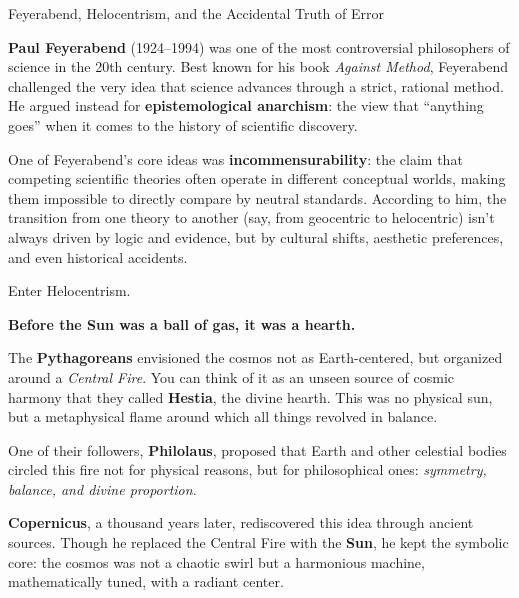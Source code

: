 \begin{HistoricalSidebar}{Feyerabend, Helocentrism, and the Accidental Truth of Error}

  \textbf{Paul Feyerabend} (1924–1994) was one of the most controversial philosophers of science in the 20th century. 
  Best known for his book \textit{Against Method}, Feyerabend challenged the very idea that science advances through 
  a strict, rational method. He argued instead for \textbf{epistemological anarchism}: the view that “anything goes” 
  when it comes to the history of scientific discovery.
  
  \medskip
  
  One of Feyerabend’s core ideas was \textbf{incommensurability}: the claim that competing scientific theories often 
  operate in different conceptual worlds, making them impossible to directly compare by neutral standards. According 
  to him, the transition from one theory to another (say, from geocentric to helocentric) isn’t always driven by logic 
  and evidence, but by cultural shifts, aesthetic preferences, and even historical accidents.
  
  \medskip

  Enter Helocentrism.

  \medskip

  \textbf{Before the Sun was a ball of gas, it was a hearth.}

  \medskip
  
  The \textbf{Pythagoreans} envisioned the cosmos not as Earth-centered, but organized around a \textit{Central Fire}.
  You can think of it as an unseen source of cosmic harmony that they called \textbf{Hestia}, the divine hearth. This 
  was no physical sun, but a metaphysical flame around which all things revolved in balance.

  \medskip
  
  One of their followers, \textbf{Philolaus}, proposed that Earth and other celestial bodies circled this fire
  not for physical reasons, but for philosophical ones: \textit{symmetry, balance, and divine proportion}.

  \medskip
  
  \textbf{Copernicus}, a thousand years later, rediscovered this idea through ancient sources. Though he replaced the 
  Central Fire with the \textbf{Sun}, he kept the symbolic core: the cosmos was not a chaotic swirl but a harmonious 
  machine, mathematically tuned, with a radiant center.

  \medskip
  

\end{HistoricalSidebar}
